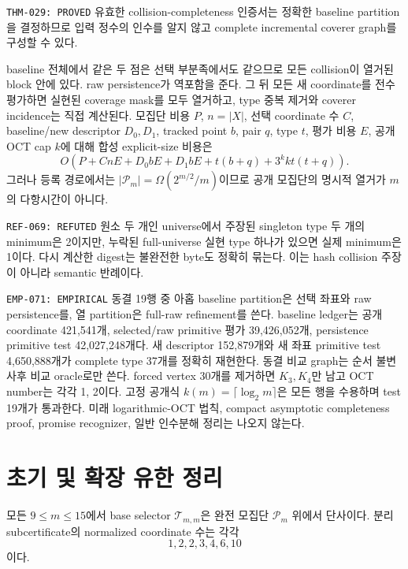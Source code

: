 \documentclass[11pt]{article}
\begin{document}
{\texttt{THM-029: PROVED}}
유효한 collision-completeness 인증서는 정확한 baseline partition을
결정하므로 입력 정수의 인수를 알지 않고 complete incremental coverer
graph를 구성할 수 있다.
\begin{claimproof}
baseline 전체에서 같은 두 점은 선택 부분족에서도 같으므로 모든
collision이 열거된 block 안에 있다. raw persistence가 역포함을 준다.
그 뒤 모든 새 coordinate를 전수 평가하면 실현된 coverage mask를 모두
열거하고, type 중복 제거와 coverer incidence는 직접 계산된다.
모집단 비용 \(P\), \(n=|X|\), 선택 coordinate 수 \(C\), baseline/new
descriptor \(D_0,D_1\), tracked point \(b\), pair \(q\), type \(t\),
평가 비용 \(E\), 공개 OCT cap \(k\)에 대해 합성 explicit-size 비용은
\[
 O\!\left(P+CnE+D_0bE+D_1bE+t(b+q)+3^kkt(t+q)\right).
\]
그러나 등록 경로에서는
\(|\mathcal P_m|=\Omega(2^{m/2}/m)\)이므로 공개 모집단의 명시적
열거가 \(m\)의 다항시간이 아니다.
\end{claimproof}

{\texttt{REF-069: REFUTED}}
원소 두 개인 universe에서 주장된 singleton type 두 개의 minimum은
2이지만, 누락된 full-universe 실현 type 하나가 있으면 실제 minimum은
1이다. 다시 계산한 digest는 불완전한 byte도 정확히 묶는다. 이는 hash
collision 주장이 아니라 semantic 반례이다.

{\texttt{EMP-071: EMPIRICAL}}
동결 19행 중 아홉 baseline partition은 선택 좌표와 raw persistence를,
열 partition은 full-raw refinement를 쓴다. baseline ledger는 공개
coordinate 421,541개, selected/raw primitive 평가 39,426,052개,
persistence primitive test 42,027,248개다. 새 descriptor 152,879개와
새 좌표 primitive test 4,650,888개가 complete type 37개를 정확히
재현한다. 동결 비교 graph는 순서 불변 사후 비교 oracle로만 쓴다.
forced vertex
30개를 제거하면 \(K_3,K_4\)만 남고 OCT number는 각각 1, 2이다.
고정 공개식 \(k(m)=\lceil\log_2m\rceil\)은 모든 행을 수용하며 test
19개가 통과한다. 미래 logarithmic-OCT 법칙, compact
asymptotic completeness proof, promise recognizer, 일반 인수분해
정리는 나오지 않는다.

\section{초기 및 확장 유한 정리}

{}
모든 \(9\le m\le15\)에서 base selector
\(\mathcal T_{m,m}\)은 완전 모집단 \(\mathcal P_m\) 위에서 단사이다.
분리 subcertificate의 normalized coordinate 수는 각각
\[
1,2,2,3,4,6,10
\]
이다.
\end{document}
